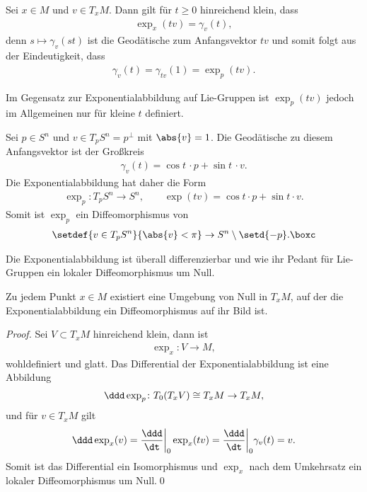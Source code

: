 \documentclass[%
	paper=a5,%
	fleqn,%
	DIV=18,%
	BCOR=0mm,
	fontsize=11pt,
	titlepage=false,%
	bibliography=totoc,
	DIV=18,%
	twoside=true,
	pdftitle=Riemannsche Geometrie,
	pdfauthor=Uwe Semmelmann,
	numbers=noendperiod]%
	{scrbook}
\begin{document}
\begin{rem}
Sei $x\in M$ und $v\in T_xM$. Dann gilt für
$t\ge 0$ hinreichend klein, dass
\begin{align*}
\exp_x(tv) = \gamma_v(t),
\end{align*}
denn $s\mapsto \gamma_v(st)$ ist die Geodätische zum Anfangsvektor $tv$ und
somit folgt aus der Eindeutigkeit, dass
\begin{align*}
\gamma_v(t) = \gamma_{tv}(1) = \exp_p(tv). 
\end{align*}

Im Gegensatz zur Exponentialabbildung auf Lie-Gruppen ist $\exp_p(tv)$ jedoch
im Allgemeinen nur für kleine $t$ definiert.\map 
\end{rem}

\begin{ex}
Sei $p\in S^n$ und $v\in T_pS^n = p^\bot$ mit $\abs{v} = 1$. Die Geodätische zu diesem
Anfangsvektor ist der Großkreis
\begin{align*}
\gamma_v(t) = \cos t\,\cdot p+ \sin t\, \cdot v. 
\end{align*}
Die Exponentialabbildung hat daher die Form
\begin{align*}
\exp_p : T_pS^n \to S^n,\qquad \exp(tv) = \cos t\cdot p + \sin t\cdot v.
\end{align*}
Somit ist $\exp_p$ ein Diffeomorphismus von
\begin{align*}
\setdef{v\in T_pS^n}{\abs{v}< \pi} \to S^n\setminus\setd{-p}.\boxc
\end{align*}
\end{ex}

Die Exponentialabbildung ist überall differenzierbar und wie ihr Pedant für Lie-Gruppen ein lokaler Diffeomorphismus um Null.


\begin{prop}
Zu jedem Punkt $x\in M$ existiert eine Umgebung von Null in $T_xM$, auf
der die Exponentialabbildung ein Diffeomorphismus auf ihr Bild ist.\fish
\end{prop}
\begin{proof}
Sei $V\subset T_xM$ hinreichend klein, dann ist
\begin{align*}
\exp_x : V\to M,
\end{align*}
wohldefiniert und glatt. Das Differential der Exponentialabbildung ist eine
Abbildung
\begin{align*}
\ddd \exp_p\colon T_0(T_xV)\cong T_xM \to T_xM,
\end{align*}
und für $v\in T_xM$ gilt
\begin{align*}
\ddd \exp_x(v) = \frac{\ddd}{\dt}\bigg|_0 \exp_x(tv)
= \frac{\ddd}{\dt}\bigg|_0 \gamma_v(t)
= v.
\end{align*}
Somit ist das Differential ein Isomorphismus und $\exp_x$ nach dem Umkehrsatz
ein lokaler Diffeomorphismus um Null.\qed
\end{proof}
\end{document}
